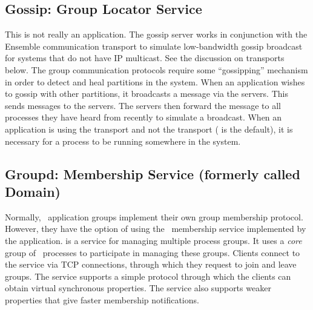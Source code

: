 \subsection{Gossip: Group Locator Service}
This is not really an application.  The gossip server works in conjunction with
the Ensemble  communication transport to simulate low-bandwidth
gossip broadcast for systems that do not have IP multicast.  See the discussion
on transports below.  The group communication protocols require some
``gossipping'' mechanism in order to detect and heal partitions in the system.
When an application wishes to gossip with other partitions, it broadcasts a
message via the  servers.  This sends messages to the
 servers.  The  servers then forward the message to
all processes they have heard from recently to simulate a broadcast.  When an
application is using the  transport and not the 
transport ( is the default), it is necessary for a 
process to be running somewhere in the system.

\subsection{Groupd: Membership Service (formerly called Domain)}
\label{section:groupd}
Normally, \ensemble\ application groups implement their own group membership
protocol.  However, they have the option of using the \ensemble\ membership
service implemented by the  application.   is a
service for managing multiple process groups.  It uses a \emph{core} group of
\ensemble\ processes to participate in managing these groups.  Clients connect
to the service via TCP connections, through which they request to join and
leave groups.  The service supports a simple protocol through which the clients
can obtain virtual synchronous properties.  The service also supports weaker
properties that give faster membership notifications.


